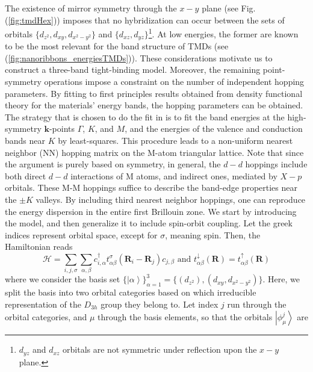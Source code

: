 The existence of mirror symmetry through the $x-y$ plane (see Fig.(\ref{fig:tmdHex})) imposes that no hybridization can occur between the sets of orbitals $\{d_{z^2}, d_{xy}, d_{x^2 - y^2} \}$ and $\{d_{xz}, d_{yz} \}$\footnote{$d_{yz}$ and $d_{xz}$ orbitals are not symmetric under reflection upon the $x-y$ plane.}.
At low energies, the former are known to be the most relevant for the band structure of \ac{TMD}s (see  (\ref{fig:nanoribbons_energiesTMDs})).
These considerations motivate us to construct a three-band tight-binding model.
Moreover, the remaining point-symmetry operations impose a constraint on the number of independent hopping parameters.
By fitting to first principles results obtained from density functional theory %
for the materials' energy bands, the hopping parameters can be obtained.
The strategy that is chosen to do the fit in \cite{liu_three-band_2013} is to fit the band energies at the high-symmetry $\bm k$-points $\Gamma$, $K$, and $M$, and the energies of the valence and conduction bands near $K$ by least-squares.
This procedure leads to a non-uniform nearest neighbor (NN) hopping matrix on the M-atom triangular lattice.
Note that since the argument is purely based on symmetry, in general, the $d-d$ hoppings include both direct $d-d$ interactions of M atoms, and indirect ones, mediated by $X-p$ orbitals.
These M-M hoppings suffice to describe the band-edge properties near the $\pm K$ valleys.
By including third nearest neighbor hoppings, one can reproduce the energy dispersion in  the entire first Brillouin zone.
We start by introducing the  model, and then generalize it to include spin-orbit coupling.
Let the greek indices represent orbital space, except for $\sigma$, meaning spin.
Then, the Hamiltonian reads
\begin{equation}
\mathcal{H} = \sum_{i, j, \sigma} \sum_{\alpha, \beta} c_{i,\alpha}^\dagger t_{\alpha \beta}^\sigma ( \bm R_i - \bm R_j ) c_{j, \beta} \text{ and } t_{\alpha \beta}^\downarrow ( \bm R ) = t_{\alpha \beta}^\uparrow ( \bm R )
\end{equation}
where we consider the basis set $\{ \left| \alpha \right\rangle \}_{\alpha = 1}^3 = \{ (d_{z^2}) , (d_{x y}, d_{ x^2 - y^2 }) \} $.
Here, we split the basis into two orbital categories based on which irreducible representation of the $D_{3h}$ group they belong to.
Let index $j$ run through the orbital categories, and $\mu$ through the basis elements, so that the orbitals $\left| \phi_\mu^j \right\rangle$ are 
